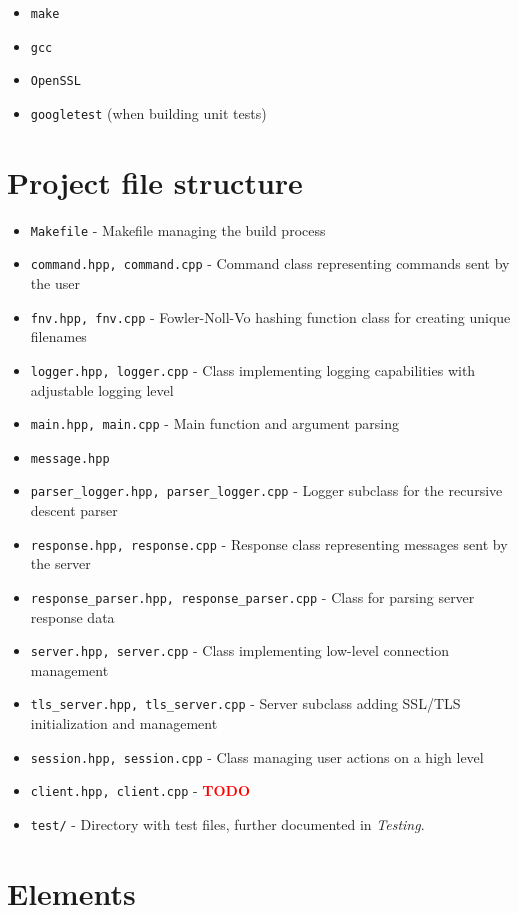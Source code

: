 \documentclass[a4]{report}
\newcommand{\TODO}{
    \textbf{\textcolor{red}{TODO}}
}
\begin{document}
\begin{itemize}
\item \texttt{make}
\item \texttt{gcc}
\item \texttt{OpenSSL}
\item \texttt{googletest} (when building unit tests)
\end{itemize}


\section{Project file structure}

\begin{itemize}
\item \texttt{Makefile} - Makefile managing the build process
\item \texttt{command.hpp, command.cpp} - Command class representing commands sent by the user
\item \texttt{fnv.hpp, fnv.cpp} - Fowler-Noll-Vo\cite{eastlake-fnv-29} hashing function class for creating unique filenames
\item \texttt{logger.hpp, logger.cpp} - Class implementing logging capabilities with adjustable logging level
\item \texttt{main.hpp, main.cpp} - Main function and argument parsing
\item \texttt{message.hpp}
\item \texttt{parser\_logger.hpp, parser\_logger.cpp} - Logger subclass for the recursive descent parser
\item \texttt{response.hpp, response.cpp} - Response class representing messages sent by the server
\item \texttt{response\_parser.hpp, response\_parser.cpp} - Class for parsing server response data
\item \texttt{server.hpp, server.cpp} - Class implementing low-level connection management
\item \texttt{tls\_server.hpp, tls\_server.cpp} - Server subclass adding SSL/TLS initialization and management
\item \texttt{session.hpp, session.cpp} - Class managing user actions on a high level
\item \texttt{client.hpp, client.cpp} - \TODO
\item \texttt{test/} - Directory with test files, further documented in \textit{Testing}.
\end{itemize}

\section{Elements}
\end{document}
